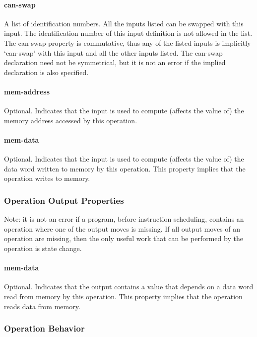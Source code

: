 \documentclass[twoside]{tceusermanual}
\begin{document}
\paragraph{can-swap}
A list of identification numbers.  All the inputs listed can be swapped with
this input.  The identification number of this input definition is not
allowed in the list.  The can-swap property is commutative, thus any of the
listed inputs is implicitly `can-swap' with this input and all the other
inputs listed.  The can-swap declaration need not be symmetrical, but it is
not an error if the implied declaration is also specified.

\paragraph{mem-address}
Optional.  Indicates that the input is used to compute (affects the value
of) the memory address accessed by this operation.

\paragraph{mem-data}
Optional.  Indicates that the input is used to compute (affects the value
of) the data word written to memory by this operation.  This property
implies that the operation writes to memory.

\subsubsection{Operation Output Properties}
\label{ssec:opoutput-properties}

Note: it is not an error if a program, before instruction scheduling,
contains an operation where one of the output moves is missing. If all
output moves of an operation are missing, then the only useful work that can
be performed by the operation is state change.

\paragraph{mem-data}
Optional.  Indicates that the output contains a value that depends on a
data word read from memory by this operation.  This property implies that
the operation reads data from memory.

\subsubsection{Operation Behavior}
\label{ssec:operation-behavior}
\end{document}
